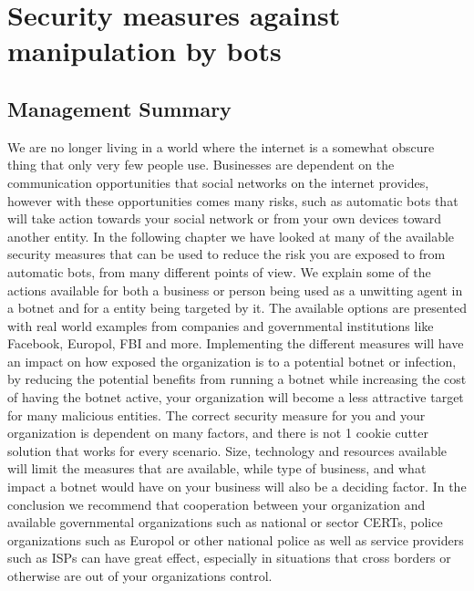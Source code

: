 \chapter{Security measures against manipulation by bots}

\section{Management Summary}
We are no longer living in a world where the internet is a somewhat obscure thing that only very few people use. Businesses are dependent on the communication opportunities that social networks on the internet provides, however with these opportunities comes many risks, such as automatic bots that will take action towards your social network or from your own devices toward another entity.
In the following chapter we have looked at many of the available security measures that can be used to reduce the risk you are exposed to from automatic bots, from many different points of view.
We explain some of the actions available for both a business or person being used as a unwitting agent in a botnet and for a entity being targeted by it.
The available options are presented with real world examples from companies and governmental institutions like Facebook, Europol, FBI and more.
Implementing the different measures will have an impact on how exposed the organization is to a potential botnet or infection, by reducing the potential benefits from running a botnet while increasing the cost of having the botnet active, your organization will become a less attractive target for many malicious entities.
The correct security measure for you and your organization is dependent on many factors, and there is not 1 cookie cutter solution that works for every scenario.
Size, technology and resources available will limit the measures that are available, while type of business, and what impact a botnet would have on your business will also be a deciding factor.
In the conclusion we recommend that cooperation between your organization and available governmental organizations such as national or sector CERTs, police organizations such as Europol or other national police as well as service providers such as ISPs can have great effect, especially in situations that cross borders or otherwise are out of your organizations control.
